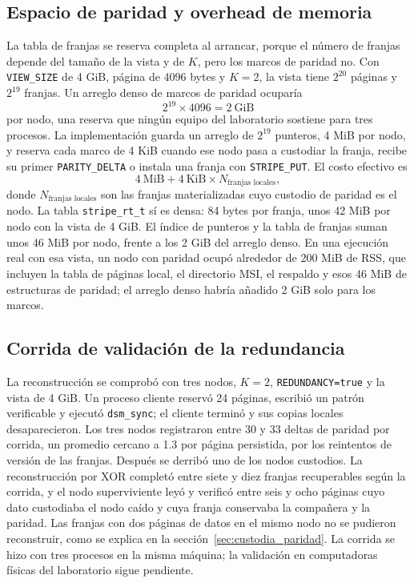 \documentclass[11pt,spanish]{article}
\begin{document}
\subsection{Espacio de paridad y overhead de memoria}

La tabla de franjas se reserva completa al arrancar, porque el número de franjas depende del tamaño de la vista y de $K$, pero los marcos de paridad no. Con \texttt{VIEW\_SIZE} de 4 GiB, página de 4096 bytes y $K=2$, la vista tiene $2^{20}$ páginas y $2^{19}$ franjas. Un arreglo denso de marcos de paridad ocuparía
\begin{equation}
2^{19} \times 4096 = 2\ \text{GiB}
\end{equation}
por nodo, una reserva que ningún equipo del laboratorio sostiene para tres procesos. La implementación guarda un arreglo de $2^{19}$ punteros, 4 MiB por nodo, y reserva cada marco de 4 KiB cuando ese nodo pasa a custodiar la franja, recibe su primer \texttt{PARITY\_DELTA} o instala una franja con \texttt{STRIPE\_PUT}. El costo efectivo es
\begin{equation}
4\ \text{MiB} + 4\ \text{KiB} \times N_{\text{franjas locales}},
\end{equation}
donde $N_{\text{franjas locales}}$ son las franjas materializadas cuyo custodio de paridad es el nodo. La tabla \texttt{stripe\_rt\_t} sí es densa: 84 bytes por franja, unos 42 MiB por nodo con la vista de 4 GiB. El índice de punteros y la tabla de franjas suman unos 46 MiB por nodo, frente a los 2 GiB del arreglo denso. En una ejecución real con esa vista, un nodo con paridad ocupó alrededor de 200 MiB de RSS, que incluyen la tabla de páginas local, el directorio MSI, el respaldo y esos 46 MiB de estructuras de paridad; el arreglo denso habría añadido 2 GiB solo para los marcos.

\subsection{Corrida de validación de la redundancia}

La reconstrucción se comprobó con tres nodos, $K=2$, \texttt{REDUNDANCY=true} y la vista de 4 GiB. Un proceso cliente reservó 24 páginas, escribió un patrón verificable y ejecutó \texttt{dsm\_sync}; el cliente terminó y sus copias locales desaparecieron. Los tres nodos registraron entre 30 y 33 deltas de paridad por corrida, un promedio cercano a 1.3 por página persistida, por los reintentos de versión de las franjas. Después se derribó uno de los nodos custodios. La reconstrucción por XOR completó entre siete y diez franjas recuperables según la corrida, y el nodo superviviente leyó y verificó entre seis y ocho páginas cuyo dato custodiaba el nodo caído y cuya franja conservaba la compañera y la paridad. Las franjas con dos páginas de datos en el mismo nodo no se pudieron reconstruir, como se explica en la sección~\ref{sec:custodia_paridad}. La corrida se hizo con tres procesos en la misma máquina; la validación en computadoras físicas del laboratorio sigue pendiente.
\end{document}

